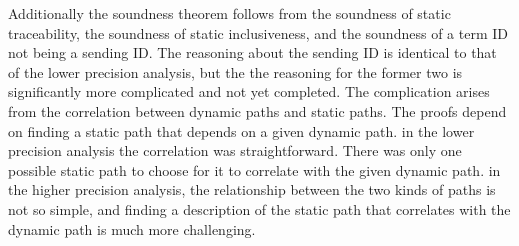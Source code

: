 \documentclass[10pt]{article}
\begin{document}
Additionally the soundness theorem follows from the soundness of static traceability,
the soundness of static inclusiveness,
and the soundness of a term ID not being a sending ID. 
The reasoning about the sending ID is identical to that of the lower precision analysis, but
the the reasoning for the former two is significantly more complicated and not yet completed.
The complication arises from the
correlation between dynamic paths and static paths.  The proofs depend on finding a static 
path that depends on a given dynamic path. in the lower precision analysis the
correlation was straightforward. There was only one possible static path to choose for it
to correlate with the given dynamic path. in the higher precision analysis, the relationship
between the two kinds of paths is not so simple, and finding a description of the static path
that correlates with the dynamic path is much more challenging.
\end{document}
